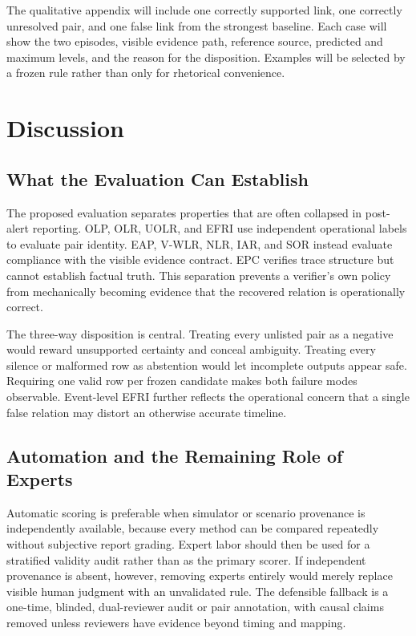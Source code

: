 \documentclass[conference]{IEEEtran}
\begin{document}
The qualitative appendix will include one correctly supported link, one correctly unresolved pair, and one false link from the strongest baseline. Each case will show the two episodes, visible evidence path, reference source, predicted and maximum levels, and the reason for the disposition. Examples will be selected by a frozen rule rather than only for rhetorical convenience.

\FloatBarrier
\section{Discussion}

\subsection{What the Evaluation Can Establish}

The proposed evaluation separates properties that are often collapsed in post-alert reporting. OLP, OLR, UOLR, and EFRI use independent operational labels to evaluate pair identity. EAP, V-WLR, NLR, IAR, and SOR instead evaluate compliance with the visible evidence contract. EPC verifies trace structure but cannot establish factual truth. This separation prevents a verifier's own policy from mechanically becoming evidence that the recovered relation is operationally correct.

The three-way disposition is central. Treating every unlisted pair as a negative would reward unsupported certainty and conceal ambiguity. Treating every silence or malformed row as abstention would let incomplete outputs appear safe. Requiring one valid row per frozen candidate makes both failure modes observable. Event-level EFRI further reflects the operational concern that a single false relation may distort an otherwise accurate timeline.

\subsection{Automation and the Remaining Role of Experts}

Automatic scoring is preferable when simulator or scenario provenance is independently available, because every method can be compared repeatedly without subjective report grading. Expert labor should then be used for a stratified validity audit rather than as the primary scorer. If independent provenance is absent, however, removing experts entirely would merely replace visible human judgment with an unvalidated rule. The defensible fallback is a one-time, blinded, dual-reviewer audit or pair annotation, with causal claims removed unless reviewers have evidence beyond timing and mapping.
\end{document}
